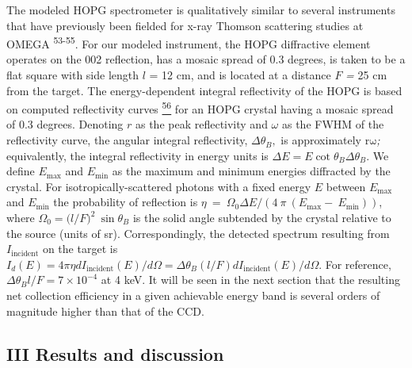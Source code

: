 The modeled HOPG spectrometer is qualitatively similar to several
instruments that have previously been fielded for x-ray Thomson
scattering studies at OMEGA \textsuperscript{53-55}. For our modeled
instrument, the HOPG diffractive element operates on the 002 reflection,
has a mosaic spread of 0.3 degrees, is taken to be a flat square with
side length \(l\) = 12 cm, and is located at a distance \(F\) \emph{=}
25 cm from the target. The energy-dependent integral reflectivity of the
HOPG is based on computed reflectivity curves
\hyperref[a.-k.-freund-a.-munkholm-and-s.-brennan-optics-for-high-brightness-synchrotron-radiation-beamlines-ii-2856-68-1996.]{\textsuperscript{56}}
for an HOPG crystal having a mosaic spread of 0.3 degrees. Denoting
\(r\) as the peak reflectivity and \(\omega\) as the FWHM of the
reflectivity curve, the angular integral reflectivity,
\(\Delta\theta_{B},\) is approximately \(\text{rω}\)\emph{;}
equivalently, the integral reflectivity in energy units is
\(\Delta E = E\cot{\theta_{B}\Delta\theta_{B}}\). We define \(E_{\max}\)
and \(E_{\min}\) as the maximum and minimum energies diffracted by the
crystal. For isotropically-scattered photons with a fixed energy \(E\)
between \(E_{\max}\) and \(E_{\min}\) the probability of reflection is
\(\eta\  = \ \Omega_{0}\Delta E/(4\ \pi\ \left( E_{\max} - \ E_{\min} \right))\),
where \(\Omega_{0} = ({l/F)}^{2}\ \sin\theta_{B}\) is the solid angle
subtended by the crystal relative to the source (units of sr).
Correspondingly, the detected spectrum resulting from
\(I_{\text{incident}}\) on the target is
\(I_{d}\left( E \right) = 4\pi\eta dI_{\text{incident}}\left( E \right)/d\Omega = \Delta\theta_{B}(l/F)dI_{\text{incident}}\left( E \right)/d\Omega\).
For reference, \(\Delta\theta_{B}l/F = 7 \times 10^{- 4}\) at 4 keV. It
will be seen in the next section that the resulting net collection
efficiency in a given achievable energy band is several orders of
magnitude higher than that of the CCD.

\subsection{III Results and
discussion}\label{iii-results-and-discussion}

